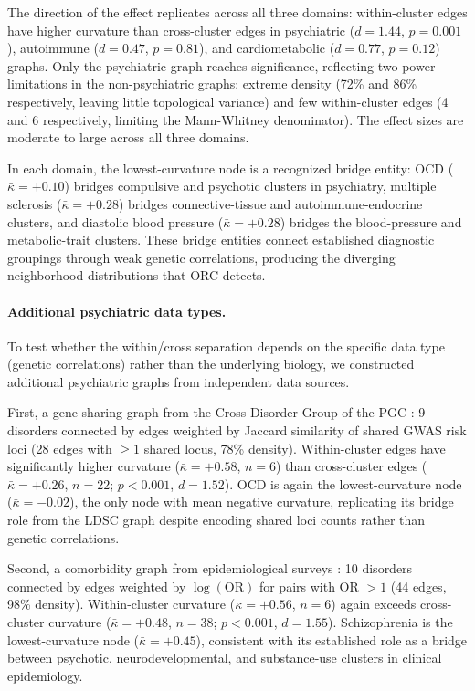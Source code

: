 \documentclass{article}
\begin{document}
The direction of the effect replicates across all three domains: within-cluster edges have higher curvature than cross-cluster edges in psychiatric ($d = 1.44$, $p = 0.001$), autoimmune ($d = 0.47$, $p = 0.81$), and cardiometabolic ($d = 0.77$, $p = 0.12$) graphs. Only the psychiatric graph reaches significance, reflecting two power limitations in the non-psychiatric graphs: extreme density (72\% and 86\% respectively, leaving little topological variance) and few within-cluster edges (4 and 6 respectively, limiting the Mann-Whitney denominator). The effect sizes are moderate to large across all three domains.

In each domain, the lowest-curvature node is a recognized bridge entity: OCD ($\bar{\kappa} = +0.10$) bridges compulsive and psychotic clusters in psychiatry, multiple sclerosis ($\bar{\kappa} = +0.28$) bridges connective-tissue and autoimmune-endocrine clusters, and diastolic blood pressure ($\bar{\kappa} = +0.28$) bridges the blood-pressure and metabolic-trait clusters. These bridge entities connect established diagnostic groupings through weak genetic correlations, producing the diverging neighborhood distributions that ORC detects.

\paragraph{Additional psychiatric data types.} To test whether the within/cross separation depends on the specific data type (genetic correlations) rather than the underlying biology, we constructed additional psychiatric graphs from independent data sources.

First, a gene-sharing graph from the Cross-Disorder Group of the PGC \citep{crossdisorder2019genomic}: 9 disorders connected by edges weighted by Jaccard similarity of shared GWAS risk loci (28 edges with $\geq 1$ shared locus, 78\% density). Within-cluster edges have significantly higher curvature ($\bar{\kappa} = +0.58$, $n = 6$) than cross-cluster edges ($\bar{\kappa} = +0.26$, $n = 22$; $p < 0.001$, $d = 1.52$). OCD is again the lowest-curvature node ($\bar{\kappa} = -0.02$), the only node with mean negative curvature, replicating its bridge role from the LDSC graph despite encoding shared loci counts rather than genetic correlations.

Second, a comorbidity graph from epidemiological surveys \citep{kessler2005prevalence, merikangas2011prevalence}: 10 disorders connected by edges weighted by $\log(\text{OR})$ for pairs with OR $> 1$ (44 edges, 98\% density). Within-cluster curvature ($\bar{\kappa} = +0.56$, $n = 6$) again exceeds cross-cluster curvature ($\bar{\kappa} = +0.48$, $n = 38$; $p < 0.001$, $d = 1.55$). Schizophrenia is the lowest-curvature node ($\bar{\kappa} = +0.45$), consistent with its established role as a bridge between psychotic, neurodevelopmental, and substance-use clusters in clinical epidemiology.
\end{document}
